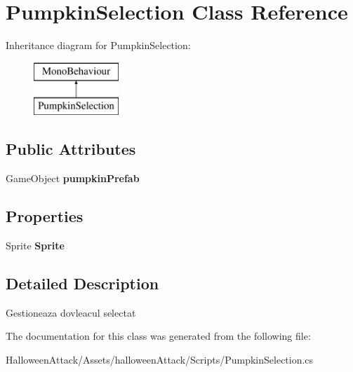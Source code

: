 \hypertarget{class_pumpkin_selection}{}\section{Pumpkin\+Selection Class Reference}
\label{class_pumpkin_selection}
Inheritance diagram for Pumpkin\+Selection\+:\begin{figure}[H]
\begin{center}
\leavevmode
\includegraphics[height=2.000000cm]{class_pumpkin_selection}
\end{center}
\end{figure}
\subsection*{Public Attributes}
\begin{DoxyCompactItemize}
\item 
\mbox{\label{class_pumpkin_selection_aa4c83c30a63e78ab3d69f4bf4b949be2}} 
Game\+Object {\bfseries pumpkin\+Prefab}
\end{DoxyCompactItemize}
\subsection*{Properties}
\begin{DoxyCompactItemize}
\item 
\mbox{\label{class_pumpkin_selection_aa185d738a4c716d8dddd1b9b9be5b269}} 
Sprite {\bfseries Sprite}
\end{DoxyCompactItemize}


\subsection{Detailed Description}
Gestioneaza dovleacul selectat 

The documentation for this class was generated from the following file\+:\begin{DoxyCompactItemize}
\item 
Halloween\+Attack/\+Assets/halloween\+Attack/\+Scripts/Pumpkin\+Selection.\+cs\end{DoxyCompactItemize}
